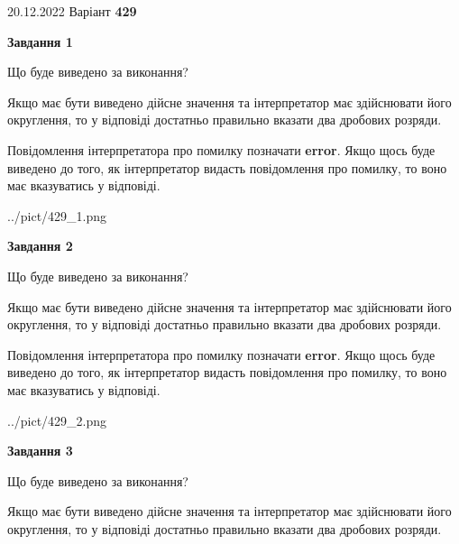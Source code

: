 \documentclass[12pt, ukrainian]{article}
\begin{document}
{20.12.2022 Варіант \No \textbf { 429 }\par}
{
\begin {Large}

{\begin {center}\textbf{Завдання 1}\end {center}}\par
Що буде виведено за виконання? \par

Якщо має бути виведено дійсне значення та інтерпретатор має здійснювати його округлення, 
то у відповіді достатньо правильно вказати два дробових розряди.

Повідомлення інтерпретатора про помилку позначати \textbf{error}.
Якщо щось буде виведено до того, як інтерпретатор видасть повідомлення про помилку, 
то воно має вказуватись у відповіді. \par

\begin{center}
	{../pict/429_1.png}
\end{center}
\newpage

{\begin {center}\textbf{Завдання 2}\end {center}}\par
Що буде виведено за виконання? \par

Якщо має бути виведено дійсне значення та інтерпретатор має здійснювати його округлення, 
то у відповіді достатньо правильно вказати два дробових розряди.

Повідомлення інтерпретатора про помилку позначати \textbf{error}.
Якщо щось буде виведено до того, як інтерпретатор видасть повідомлення про помилку, 
то воно має вказуватись у відповіді. \par

\begin{center}
	{../pict/429_2.png}
\end{center}
\newpage

{\begin {center}\textbf{Завдання 3}\end {center}}\par
Що буде виведено за виконання? \par

Якщо має бути виведено дійсне значення та інтерпретатор має здійснювати його округлення, 
то у відповіді достатньо правильно вказати два дробових розряди.


\end{Large}}
\end{document}
